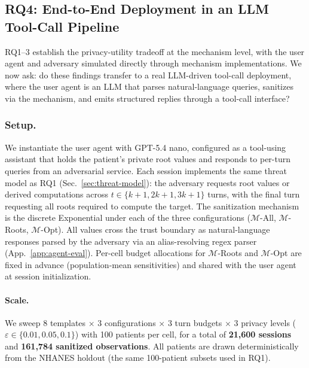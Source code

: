 \subsection{RQ4: End-to-End Deployment in an LLM Tool-Call Pipeline}
\label{sec:experiments-rq4}

RQ1--3 establish the privacy-utility tradeoff at the mechanism level, with the user agent and adversary simulated directly through mechanism implementations. We now ask: do these findings transfer to a real LLM-driven tool-call deployment, where the user agent is an LLM that parses natural-language queries, sanitizes via the mechanism, and emits structured replies through a tool-call interface?

\subsubsection{Setup.}
We instantiate the user agent with GPT-5.4 nano, configured as a tool-using assistant that holds the patient's private root values and responds to per-turn queries from an adversarial service. Each session implements the same threat model as RQ1 (Sec.~\ref{sec:threat-model}): the adversary requests root values or derived computations across $t \in \{k{+}1, 2k{+}1, 3k{+}1\}$ turns, with the final turn requesting all roots required to compute the target. The sanitization mechanism is the discrete Exponential under each of the three configurations ($\mathcal{M}$-All, $\mathcal{M}$-Roots, $\mathcal{M}$-Opt). All values cross the trust boundary as natural-language responses parsed by the adversary via an alias-resolving regex parser (App.~\ref{app:agent-eval}). Per-cell budget allocations for $\mathcal{M}$-Roots and $\mathcal{M}$-Opt are fixed in advance (population-mean sensitivities) and shared with the user agent at session initialization.

\paragraph{Scale.} We sweep 8 templates $\times$ 3 configurations $\times$ 3 turn budgets $\times$ 3 privacy levels ($\varepsilon \in \{0.01, 0.05, 0.1\}$) with 100 patients per cell, for a total of \textbf{21{,}600 sessions} and \textbf{161{,}784 sanitized observations}. All patients are drawn deterministically from the NHANES holdout (the same 100-patient subsets used in RQ1).


